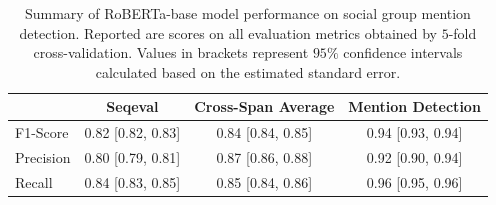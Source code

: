 \begin{table}[htbp]
\centering
\begin{tabular}{lccc}
\toprule
 & Seqeval & Cross-Span Average & Mention Detection \\
\midrule
F1-Score & 0.82 [0.82, 0.83] & 0.84 [0.84, 0.85] & 0.94 [0.93, 0.94] \\
Precision & 0.80 [0.79, 0.81] & 0.87 [0.86, 0.88] & 0.92 [0.90, 0.94] \\
Recall & 0.84 [0.83, 0.85] & 0.85 [0.84, 0.86] & 0.96 [0.95, 0.96] \\
\bottomrule
\end{tabular}
\caption[Performance evaluation of best model for social group mention detection]{Summary of RoBERTa-base model performance on social group mention detection. Reported are scores on all evaluation metrics obtained by $5$-fold cross-validation. Values in brackets represent $95\%$ confidence intervals calculated based on the estimated standard error.}
\label{tab:detailed_results_group_detection}
\end{table}